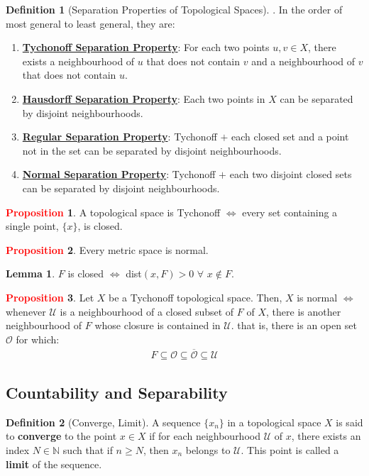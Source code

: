 \documentclass[11pt]{article}
\newcommand{\open}[0]{\mathcal{O}}
\newcommand{\hood}[0]{\mathcal{U}}
\theoremstyle{definition}
\theoremstyle{definition}
\newtheorem{lemma}[theorem]{Lemma}
\theoremstyle{definition}
\newtheorem{definition}{\textcolor{OliveGreen}{Definition}}
\newtheorem{prop}{\textcolor{red}{Proposition}}
\theoremstyle{remark}
\begin{document}
\begin{definition}[Separation Properties of Topological Spaces]. In the order of most general to least general, they are: 
\begin{enumerate}[noitemsep]
	\item \underline{\textbf{Tychonoff Separation Property}}: For each two points $u, v \in X$, there exists a neighbourhood of $u$ that does not contain $v$ and a neighbourhood of $v$ that does not contain $u$. 
	\item \underline{\textbf{Hausdorff Separation Property}}: Each two points in $X$ can be separated by disjoint neighbourhoods. 
	\item \underline{\textbf{Regular Separation Property}}: Tychonoff $+$ each closed set and a point not in the set can be separated by disjoint neighbourhoods.
	\item \underline{\textbf{Normal Separation Property}}: Tychonoff $+$ each two disjoint closed sets can be separated by disjoint neighbourhoods. 
\end{enumerate}
\end{definition}

\begin{prop}
	A topological space is Tychonoff $\iff$ every set containing a single point, $\{ x \}$, is closed. 
\end{prop}

\begin{prop}
	Every metric space is normal.
\end{prop}

\begin{lemma}
	$F$ is closed $\iff$ dist$(x, F) > 0$ $\forall$ $ x \notin F$. 
\end{lemma}

\begin{prop}
	Let $X$ be a Tychonoff topological space. Then, $X$ is normal $\iff$ whenever $\hood$ is a neighbourhood of a closed subset of $F$ of $X$, there is another neighbourhood of $F$ whose closure is contained in $\hood$. that is, there is an open set $\open$ for which: 
	\begin{align}
		F \subseteq \open \subseteq \overline{\open} \subseteq \hood 
	\end{align}
\end{prop}


\subsection{Countability and Separability}
\begin{definition}[Converge, Limit]
	A sequence $\{ x_n \}$ in a topological space $X$ is said to \textbf{converge} to the point $x \in X$ if for each neighbourhood $\hood$ of $x$, there exists an index $N \in \mathbb{N}$ such that if $n \geq N$, then $x_n$ belongs to $\hood$. This point is called a \textbf{limit} of the sequence. 
\end{definition}
\end{document}

